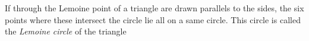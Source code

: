\documentclass{article}
\begin{document}
If through the Lemoine point of a triangle are drawn parallels to the sides, the six points where these intersect the circle lie all on a same circle. This circle is called the \emph{Lemoine circle} of the triangle
\end{document}
